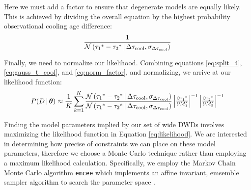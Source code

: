 \documentclass[12pt,preprint]{hackaastex}
\begin{document}
Here we must add a factor to ensure that degenerate models are equally likely. This is achieved by dividing the overall equation by the highest probability observational cooling age difference:
\begin{equation}
\frac{1}{\mathcal{N} \left( \ta^* -\tb^* \given \Delta \tau_{\rm cool}, \sigma_{\Delta \tau_{\rm cool}} \right)} \label{eq:norm_factor}
\end{equation}

Finally, we need to normalize our likelihood. Combining equations \ref{eq:split_4}, \ref{eq:gauss_t_cool}, and \ref{eq:norm_factor}, and normalizing, we arrive at our likelihood function:
\begin{equation}
P(D \given \bs{\theta}) \approx \frac{1}{K} \sum_{k=1}^{K}  \frac{\mathcal{N} \left( \ta^* -\tb^* \given \Delta \tau_{\rm cool}, \sigma_{\Delta \tau_{\rm cool}} \right)}{\mathcal{N} \left( \ta^* -\tb^* \given \Delta \tau_{\rm cool}, \sigma_{\Delta \tau_{\rm cool}} \right)} \begin{vmatrix} \frac{\partial \ta^*}{\partial M_1'} \end{vmatrix}^{-1}  \begin{vmatrix} \frac{\partial \tb^*}{\partial M_2'} \end{vmatrix}^{-1} \label{eq:likelihood}
\end{equation}


Finding the model parameters implied by our set of wide DWDs involves maximizing the likelihood function in Equation \ref{eq:likelihood}. We are interested in determining how precise of constraints we can place on these model parameters, therefore we choose a Monte Carlo technique rather than employing a maximum likelihood calculation. Specifically, we employ the Markov Chain Monte Carlo algorithm {\tt emcee} \citep{foreman-mackey13} which implements an affine invariant, emsemble sampler algorithm to search the parameter space \citep{goodman10}.





\clearpage


%
\end{document}
